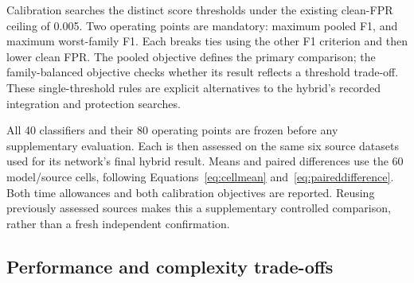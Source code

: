 Calibration searches the distinct score thresholds under the existing clean-FPR ceiling of 0.005. Two operating points are mandatory: maximum pooled F1, and maximum worst-family F1. Each breaks ties using the other F1 criterion and then lower clean FPR. The pooled objective defines the primary comparison; the family-balanced objective checks whether its result reflects a threshold trade-off. These single-threshold rules are explicit alternatives to the hybrid's recorded integration and protection searches.

All 40 classifiers and their 80 operating points are frozen before any supplementary evaluation. Each is then assessed on the same six source datasets used for its network's final hybrid result. Means and paired differences use the 60 model/source cells, following Equations~\ref{eq:cellmean} and~\ref{eq:paireddifference}. Both time allowances and both calibration objectives are reported. Reusing previously assessed sources makes this a supplementary controlled comparison, rather than a fresh independent confirmation.

\clearpage
\subsection{Performance and complexity trade-offs}

